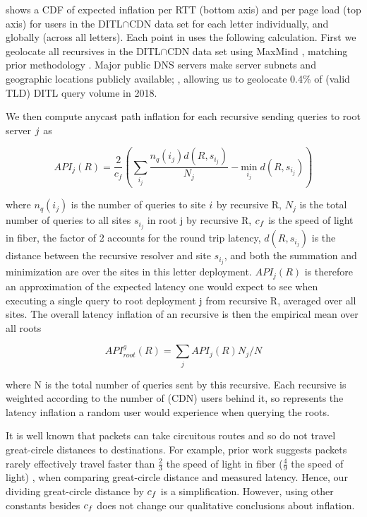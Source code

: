 \documentclass[sigconf,letterpaper,nonacm,10pt,anonymous]{acmart}
\begin{document}
 shows a CDF of expected inflation per RTT
(bottom axis) and per page load (top axis) for users in the
DITL\(\cap\)CDN data set for each letter individually, and globally
(across all letters). Each point in  uses
the following calculation. First we geolocate all recursives in the
DITL\(\cap\)CDN data set using MaxMind \cite{maxmind}, matching prior
methodology \cite{li_levin_spring_bhattacharjee_2018}. Major public DNS
servers make server subnets and geographic locations publicly available;
\cite{google_public_dns}, allowing us to geolocate 0.4\% of (valid TLD)
DITL query volume in 2018.

We then compute anycast path inflation for each recursive sending
queries to root server \(\mathnormal{j}\) as

\begin{equation}
\label{eq:root_dns_path_inflation}
API_{j}(R) = \frac{2}{c_f} (\sum_{i_{j}} \frac{n_q(i_j) d(R, s_{i_{j}})}{N_j} -  \underset{{i_j}} {\text{min}} \; d(R, s_{i_{j}}))
\end{equation}

where \(n_q(i_j)\) is the number of queries to site \(\mathnormal{i}\)
by recursive R, \(N_j\) is the total number of queries to all sites
\(s_{i_{j}}\) in root j by recursive R, \(\mathnormal{c_f}\) is the
speed of light in fiber, the factor of 2 accounts for the round trip
latency, \(d(R, s_{i_{j}})\) is the distance between the recursive
resolver and site \(s_{i_{j}}\), and both the summation and minimization
are over the sites in this letter deployment. \(API_{j} (R)\) is
therefore an approximation of the expected latency one would expect to
see when executing a single query to root deployment j from recursive R,
averaged over all sites. The overall latency inflation of an recursive
is then the empirical mean over all roots

\begin{equation}
API^g_{root}(R) = \sum_{j} API_{j}(R) N_j / N
\end{equation}

where N is the total number of queries sent by this recursive. Each
recursive is weighted according to the number of (CDN) users behind it,
so  represents the latency inflation a
random user would experience when querying the roots.

It is well known that packets can take circuitous routes and so do not
travel great-circle distances to destinations. For example, prior work
suggests packets rarely effectively travel faster than \(\frac{2}{3}\)
the speed of light in fiber (\(\frac{4}{9}\) the speed of light)
\cite{katz2006towards}, when comparing great-circle distance and
measured latency. Hence, our dividing great-circle distance by
\(\mathnormal{c_f}\) is a simplification. However, using other constants
besides \(\mathnormal{c_f}\) does not change our qualitative conclusions
about inflation.
\end{document}
